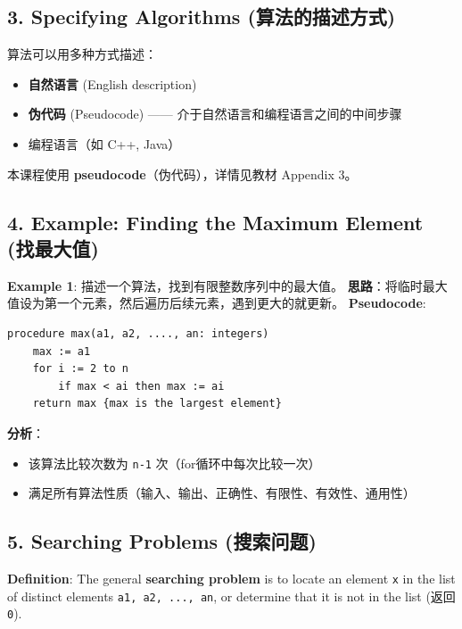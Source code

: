 \documentclass[10pt,a4paper,openany]{ctexbook}
\theoremstyle{definition}
\theoremstyle{remark}
\renewenvironment{quote}
  {\list{}{\leftmargin=1em\rightmargin=0pt\topsep=0.5pt\partopsep=0pt}\item[]}
  {\endlist}
\begin{document}
\subsection{3. Specifying Algorithms (算法的描述方式)}

算法可以用多种方式描述：
\begin{itemize}
\item \textbf{自然语言} (English description)
\item \textbf{伪代码} (Pseudocode) —— 介于自然语言和编程语言之间的中间步骤
\item 编程语言（如 C++, Java）

\end{itemize}

\begin{quote}
本课程使用 \textbf{pseudocode}（伪代码），详情见教材 Appendix 3。

\end{quote}
\vspace{-2pt}

\subsection{4. Example: Finding the Maximum Element (找最大值)}

\textbf{Example 1}: 描述一个算法，找到有限整数序列中的最大值。
\textbf{思路}：将临时最大值设为第一个元素，然后遍历后续元素，遇到更大的就更新。
\textbf{Pseudocode}:
{\footnotesize\begin{verbatim}
procedure max(a1, a2, ...., an: integers)
    max := a1
    for i := 2 to n
        if max < ai then max := ai
    return max {max is the largest element}
\end{verbatim}}

\textbf{分析}：
\begin{itemize}
\item 该算法比较次数为 \texttt{n-1} 次（for循环中每次比较一次）
\item 满足所有算法性质（输入、输出、正确性、有限性、有效性、通用性）

\end{itemize}

\vspace{-2pt}

\subsection{5. Searching Problems (搜索问题)}

\begin{quote}
\textbf{Definition}: The general \textbf{searching problem} is to locate an element \texttt{x} in the list of distinct elements \texttt{a1, a2, ..., an}, or determine that it is not in the list (返回 \texttt{0}).

\end{quote}
\end{document}
